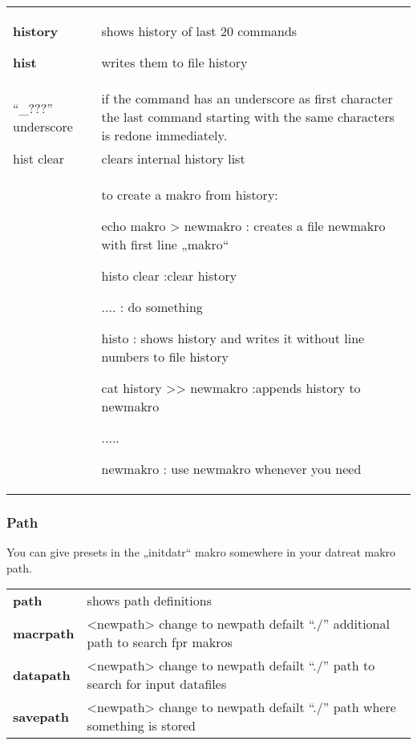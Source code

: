 \documentclass[]{article}
\begin{document}
\begin{longtable}[]{@{}ll@{}}
\toprule
\endhead
\begin{minipage}[t]{0.47\columnwidth}\raggedright
\textbf{history}

\textbf{hist }\strut
\end{minipage} & \begin{minipage}[t]{0.47\columnwidth}\raggedright
shows history of last 20 commands

writes them to file history\strut
\end{minipage}\tabularnewline
``\_???'' underscore & if the command has an underscore as first
character the last command starting with the same characters is redone
immediately.\tabularnewline
hist clear & clears internal history list\tabularnewline
\begin{minipage}[t]{0.47\columnwidth}\raggedright
\strut
\end{minipage} & \begin{minipage}[t]{0.47\columnwidth}\raggedright
to create a makro from history:

echo makro \textgreater{} newmakro : creates a file newmakro with first
line „makro``

histo clear :clear history

.... : do something

histo : shows history and writes it without line numbers to file history

cat history \textgreater{}\textgreater{} newmakro :appends history to
newmakro

.....

newmakro : use newmakro whenever you need\strut
\end{minipage}\tabularnewline
\bottomrule
\end{longtable}

\hypertarget{path}{%
\subsubsection{Path}\label{path}}

You can give presets in the „initdatr`` makro somewhere in your datreat
makro path.

\begin{longtable}[]{@{}ll@{}}
\toprule
\endhead
\textbf{path} & shows path definitions\tabularnewline
\textbf{macrpath} & \textless{}newpath\textgreater{} change to newpath
defailt ``./'' additional path to search fpr makros\tabularnewline
\textbf{datapath} & \textless{}newpath\textgreater{} change to newpath
defailt ``./'' path to search for input datafiles\tabularnewline
\textbf{savepath } & \textless{}newpath\textgreater{} change to newpath
defailt ``./'' path where something is stored\tabularnewline
\bottomrule
\end{longtable}
\end{document}
